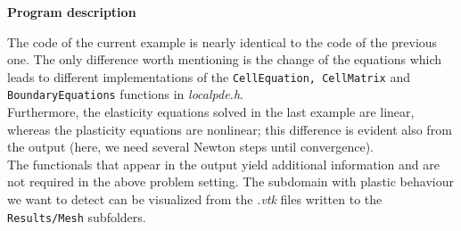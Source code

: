 \vspace{0.2cm}

\textbf{Program description}

\vspace{0.2cm}

The code of the current example is nearly identical to the code of the previous one. The only difference worth mentioning is the change of the equations which leads to different implementations of the \texttt{CellEquation, CellMatrix} and \texttt{BoundaryEquations} functions in \textit{localpde.h}.\\
Furthermore, the elasticity equations solved in the last example are linear, whereas the plasticity equations are nonlinear; this difference is evident also from the output (here, we need several Newton steps until convergence).\\
The functionals that appear in the output yield additional information and are not required in the above problem setting. The subdomain with plastic behaviour we want to detect can be visualized from the \textit{.vtk} files written to the \texttt{Results/Mesh} subfolders.